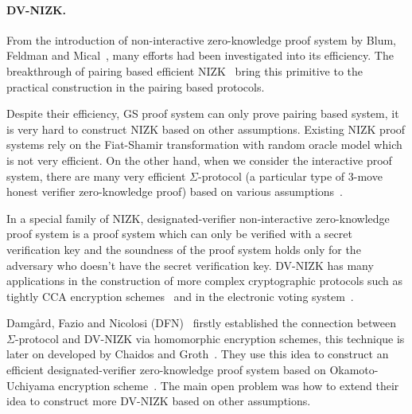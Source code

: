 \paragraph{DV-NIZK.}
From the introduction of non-interactive zero-knowledge proof system by Blum, Feldman and Mical~\cite{DBLP:conf/stoc/BlumFM88},
many efforts had been investigated into its efficiency.
The breakthrough of pairing based efficient NIZK~\cite{DBLP:conf/eurocrypt/GrothS08} bring this primitive to the practical construction in the pairing based protocols.

Despite their efficiency, GS proof system can only prove pairing based system, it is very hard to construct NIZK based on other assumptions.
Existing NIZK proof systems rely on the Fiat-Shamir transformation with random oracle model which is not very efficient.
On the other hand, when we consider the interactive proof system,
there are many very efficient $\Sigma$-protocol (a particular type of 3-move honest verifier zero-knowledge proof) based on various assumptions~\cite{DBLP:journals/iacr/BaumDOP16,DBLP:conf/crypto/BaumDLN16}.

In a special family of NIZK, designated-verifier non-interactive zero-knowledge proof system is a proof system which can only be verified with a secret verification key
and the soundness of the proof system holds only for the adversary who doesn't have the secret verification key.
DV-NIZK has many applications in the construction of more complex cryptographic protocols such as
tightly CCA encryption schemes~\cite{DBLP:conf/eurocrypt/GayHKW16} and in the electronic voting system~\cite{DBLP:conf/pkc/ChaidosG15}.


Damg\r{a}rd, Fazio and Nicolosi (DFN)~\cite{DBLP:conf/tcc/DamgardFN06} firstly established the connection between $\Sigma$-protocol and DV-NIZK via homomorphic encryption schemes,
this technique is later on developed by Chaidos and Groth~\cite{DBLP:conf/pkc/ChaidosG15}.
They use this idea to construct an efficient designated-verifier zero-knowledge proof system based on Okamoto-Uchiyama encryption scheme~\cite{DBLP:conf/eurocrypt/OkamotoU98}.
The main open problem was how to extend their idea to construct more DV-NIZK based on other assumptions.
